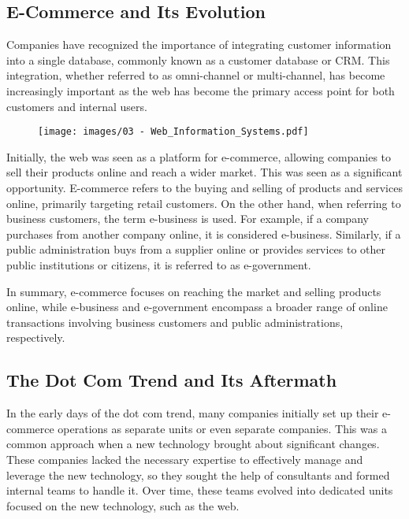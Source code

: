 \subsection{E-Commerce and Its
  Evolution}\label{e-commerce-and-its-evolution}

Companies have recognized the importance of integrating customer
information into a single database, commonly known as a customer
database or CRM. This integration, whether referred to as omni-channel
or multi-channel, has become increasingly important as the web has
become the primary access point for both customers and internal users.

\begin{figure}[!h]
  \centering
  \texttt{[image: images/03 - Web\_Information\_Systems.pdf]}
\end{figure}

Initially, the web was seen as a platform for e-commerce, allowing
companies to sell their products online and reach a wider market. This
was seen as a significant opportunity. E-commerce refers to the buying
and selling of products and services online, primarily targeting retail
customers. On the other hand, when referring to business customers, the
term e-business is used. For example, if a company purchases from
another company online, it is considered e-business. Similarly, if a
public administration buys from a supplier online or provides services
to other public institutions or citizens, it is referred to as
e-government.

In summary, e-commerce focuses on reaching the market and selling
products online, while e-business and e-government encompass a broader
range of online transactions involving business customers and public
administrations, respectively.

\subsection{The Dot Com Trend and Its
  Aftermath}\label{the-dot-com-trend-and-its-aftermath}

In the early days of the dot com trend, many companies initially set up
their e-commerce operations as separate units or even separate
companies. This was a common approach when a new technology brought
about significant changes. These companies lacked the necessary
expertise to effectively manage and leverage the new technology, so they
sought the help of consultants and formed internal teams to handle it.
Over time, these teams evolved into dedicated units focused on the new
technology, such as the web.


